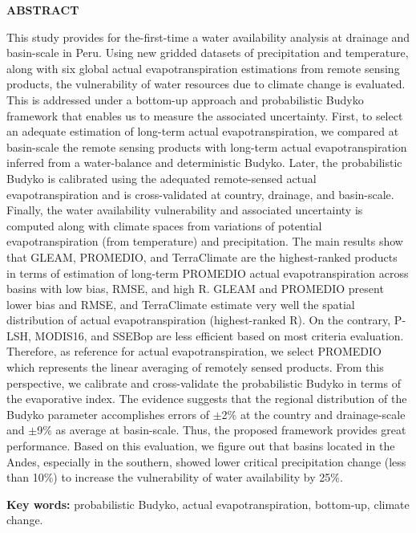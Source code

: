 \clearpage

\begin{center}
\large{\textbf {ABSTRACT}}
\end{center}

This study provides for the-first-time a water availability analysis at drainage and basin-scale in Peru. Using new gridded datasets of precipitation and temperature, along with six global actual evapotranspiration estimations from remote sensing products, the vulnerability of water resources due to climate change is evaluated. This is addressed under a bottom-up approach and probabilistic Budyko framework that enables us to measure the associated uncertainty. First, to select an adequate estimation of long-term actual evapotranspiration, we compared at basin-scale the remote sensing products with long-term actual evapotranspiration inferred from a water-balance and deterministic Budyko. Later, the probabilistic Budyko is calibrated using the adequated remote-sensed actual evapotranspiration and is cross-validated at country, drainage, and basin-scale. Finally, the water availability vulnerability and associated uncertainty is computed along with climate spaces from variations of potential evapotranspiration (from temperature) and precipitation. The main results show that GLEAM, PROMEDIO, and TerraClimate are the highest-ranked products in terms of estimation of long-term PROMEDIO actual evapotranspiration across basins with low bias, RMSE, and high R. GLEAM and PROMEDIO present lower bias and RMSE, and TerraClimate estimate very well the spatial distribution of actual evapotranspiration (highest-ranked R). On the contrary, P‐LSH, MODIS16, and SSEBop are less efficient based on most criteria evaluation. Therefore, as reference for actual evapotranspiration, we select PROMEDIO which represents the linear averaging of remotely sensed products. From this perspective, we calibrate and cross-validate the probabilistic Budyko in terms of the evaporative index. The evidence suggests that the regional distribution of the Budyko parameter accomplishes errors of $\pm$2\% at the country and drainage-scale and $\pm$9\% as average at basin-scale. Thus, the proposed framework provides great performance. Based on this evaluation, we figure out that basins located in the Andes, especially in the southern, showed lower critical precipitation change (less than 10\%) to increase the vulnerability of water availability by 25\%.

\textbf {Key words:} probabilistic Budyko, actual evapotranspiration, bottom-up, climate change.

\clearpage
